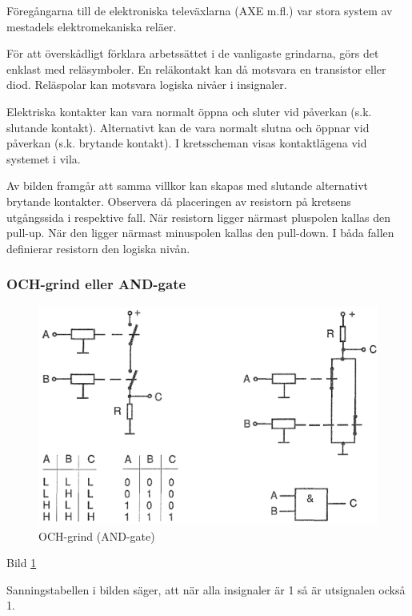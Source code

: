Föregångarna till de elektroniska televäxlarna (AXE m.fl.) var stora system av
mestadels elektromekaniska reläer.

För att överskådligt förklara arbetssättet i de vanligaste grindarna, görs det
enklast med reläsymboler. En reläkontakt kan då motsvara en transistor eller
diod. Reläspolar kan motsvara logiska nivåer i insignaler.

Elektriska kontakter kan vara normalt öppna och sluter vid påverkan (s.k.
slutande kontakt). Alternativt kan de vara normalt slutna och öppnar vid
påverkan (s.k. brytande kontakt). I kretsscheman visas kontaktlägena vid
systemet i vila.

Av bilden framgår att samma villkor kan skapas med slutande alternativt brytande
kontakter. Observera då placeringen av resistorn på kretsens utgångssida i
respektive fall. När resistorn ligger närmast pluspolen kallas den pull-up. När
den ligger närmast minuspolen kallas den pull-down. I båda fallen definierar
resistorn den logiska nivån.

\subsubsection{OCH-grind eller AND-gate}

\begin{figure}
\includegraphics[width=\textwidth]{images/cropped_pdfs/bild_2_2-37.pdf}
\caption{OCH-grind (AND-gate)}
\label{fig:BildII2-37}
\end{figure}

Bild \ref{fig:BildII2-37}

Sanningstabellen i bilden säger, att när alla insignaler är 1 så är utsignalen
också 1.

